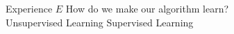 %

\begin{slide}{Experience $E$}
  \centering
  {\LARGE How do we make our algorithm learn?}\\
  \vspace{1.3cm}
  \large
  \pause
  Unsupervised Learning %
  \hspace{1cm}
  Supervised Learning %
\end{slide}
